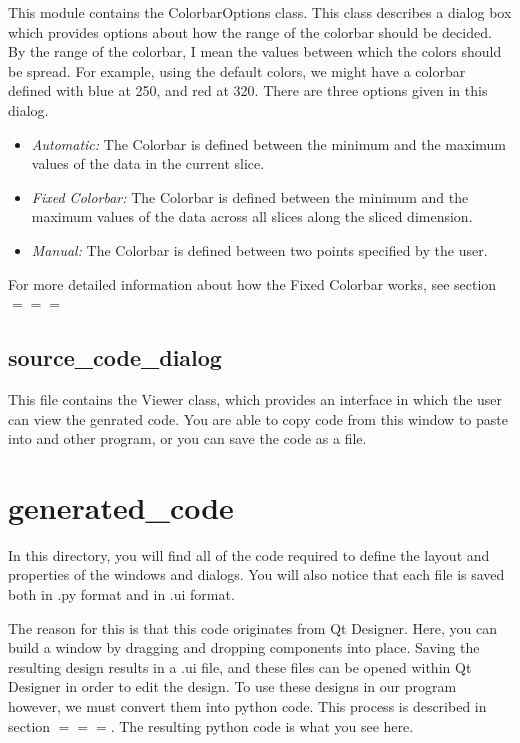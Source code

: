 \documentclass[whitecover]{MO_report}
\begin{document}
This module contains the ColorbarOptions class. This class describes a dialog
box which provides options about how the range of the colorbar should be
decided. By the range of the colorbar, I mean the values between which the
colors should be spread. For example, using the default colors, we might have
a colorbar defined with blue at 250, and red at 320. There are three options
given in this dialog.
\begin{itemize}

\item
\emph{Automatic:} The Colorbar is defined between the minimum and the maximum
values of the data in the current slice.

\item
\emph{Fixed Colorbar:} The Colorbar is defined between the minimum and the
maximum values of the data across all slices along the sliced dimension.

\item
\emph{Manual:} The Colorbar is defined between two points specified by the
user. 

\end{itemize}

For more detailed information about how the Fixed Colorbar works, see section
$===$

\subsection{source\_code\_dialog}

This file contains the Viewer class, which provides an interface in which the
user can view the genrated code. You are able to copy code from this window
to paste into and other program, or you can save the code as a file.

\section{generated\_code}

In this directory, you will find all of the code required to define the layout
and properties of the windows and dialogs. You will also notice that each file
is saved both in .py format and in .ui format.

The reason for this is that this code originates from Qt Designer. Here, you
can build a window by dragging and dropping components into place. Saving the
resulting design results in a .ui file, and these files can be opened within
Qt Designer in order to edit the design. To use these designs in our program
however, we must convert them into python code. This process is described in
section $===$. The resulting python code is what you see here. 
\end{document}
